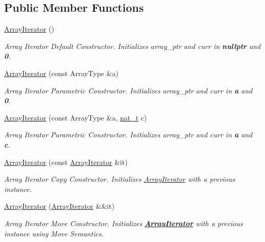 \subsection*{Public Member Functions}
\begin{DoxyCompactItemize}
\item 
\hyperlink{class_designar_1_1_array_iterator_a0fd19f5e2f3f3c13470d62b118575582}{Array\+Iterator} ()
\begin{DoxyCompactList}\small\item\em Array Iterator Default Constructor. Initializes {\itshape array\+\_\+ptr} and {\itshape curr} in {\bfseries nullptr} and {\bfseries 0}. \end{DoxyCompactList}\item 
\hyperlink{class_designar_1_1_array_iterator_a7d5565949d8cd3100686c1ff73eb1618}{Array\+Iterator} (const Array\+Type \&a)
\begin{DoxyCompactList}\small\item\em Array Iterator Parametric Constructor. Initializes {\itshape array\+\_\+ptr} and {\itshape curr} in {\bfseries a} and {\bfseries 0}. \end{DoxyCompactList}\item 
\hyperlink{class_designar_1_1_array_iterator_a1c9df0412f7bb1dabbd15f6772d8b9a3}{Array\+Iterator} (const Array\+Type \&a, \hyperlink{namespace_designar_aa72662848b9f4815e7bf31a7cf3e33d1}{nat\+\_\+t} c)
\begin{DoxyCompactList}\small\item\em Array Iterator Parametric Constructor. Initializes {\itshape array\+\_\+ptr} and {\itshape curr} in {\bfseries a} and {\bfseries c}. \end{DoxyCompactList}\item 
\hyperlink{class_designar_1_1_array_iterator_a7d3069da40d921310097dbde17fb0204}{Array\+Iterator} (const \hyperlink{class_designar_1_1_array_iterator}{Array\+Iterator} \&it)
\begin{DoxyCompactList}\small\item\em Array Iterator Copy Constructor. Initializes \hyperlink{class_designar_1_1_array_iterator}{Array\+Iterator} with a previous instance. \end{DoxyCompactList}\item 
\hyperlink{class_designar_1_1_array_iterator_ad27f115766207137bd74ef47d477f4f5}{Array\+Iterator} (\hyperlink{class_designar_1_1_array_iterator}{Array\+Iterator} \&\&it)
\begin{DoxyCompactList}\small\item\em Array Iterator Move Constructor. Initializes {\bfseries \hyperlink{class_designar_1_1_array_iterator}{Array\+Iterator}} with a previous instance using Move Semantics. \end{DoxyCompactList}\item 

\end{DoxyCompactItemize}
